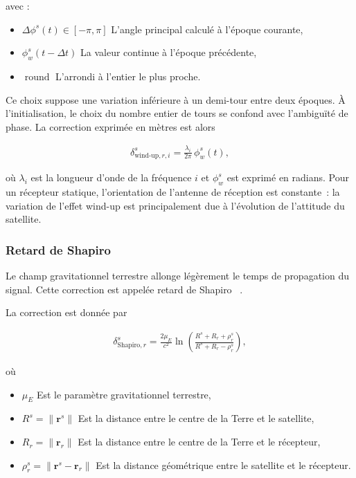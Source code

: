 avec :
\begin{itemize}
    \item $\Delta\phi^s(t)\in[-\pi,\pi]$ L'angle principal calculé à l'époque courante,
    \item $\phi_w^s(t-\Delta t)$ La valeur continue à l'époque précédente,
    \item $\operatorname{round}$ L'arrondi à l'entier le plus proche.
\end{itemize}
Ce choix suppose une variation inférieure à un demi-tour entre deux époques.
À l'initialisation, le choix du nombre entier de tours se confond avec
l'ambiguïté de phase. La correction exprimée en mètres est alors

\begin{align}
\delta_{\mathrm{wind\text{-}up},r,i}^s
=
\frac{\lambda_i}{2\pi}\,\phi_w^s(t),
\label{eq:windup}
\end{align}

où $\lambda_i$ est la longueur d'onde de la fréquence $i$ et $\phi_w^s$ est
exprimé en radians. Pour un récepteur statique, l'orientation de l'antenne
de réception est constante~: la variation de l'effet wind-up est
principalement due à l'évolution de l'attitude du satellite.


\subsubsection{Retard de Shapiro}\label{shapiro}

Le champ gravitationnel terrestre allonge légèrement le temps de propagation
du signal. Cette correction est appelée retard de
Shapiro ~\cite{ashby2003}.

La correction est donnée par

\begin{align}
\delta_{\mathrm{Shapiro},r}^s
=
\frac{2\mu_E}{c^2}
\ln
\left(
\frac{R^s+R_r+\rho_r^s}
     {R^s+R_r-\rho_r^s}
\right),
\end{align}

où

\begin{itemize}
    \item $\mu_E$ Est le paramètre gravitationnel terrestre,
    \item $R^s = \|\mathbf r^s\|$ Est la distance entre le centre de la Terre et le satellite,
    \item $R_r = \|\mathbf r_r\|$ Est la distance entre le centre de la Terre et le récepteur,
    \item $\rho_r^s = \|\mathbf r^s - \mathbf r_r\|$ Est la distance géométrique entre le satellite et le récepteur.
\end{itemize}

